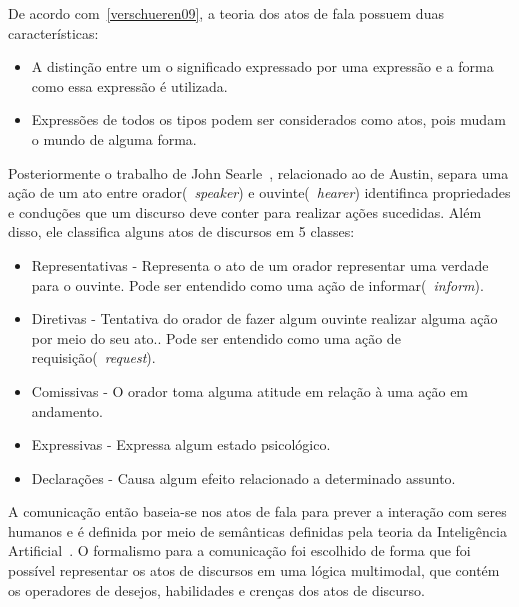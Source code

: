 De acordo com~\ref{verschueren09}, a teoria dos atos de fala possuem duas características:
\begin{itemize}
	\item A distinção entre um o significado expressado por uma expressão e a forma como essa expressão é utilizada.
	\item Expressões de todos os tipos podem ser considerados como atos, pois mudam o mundo de alguma forma.
\end{itemize}

Posteriormente o trabalho de John Searle~\cite{searle69}, relacionado ao de Austin, separa uma ação de um ato entre orador(~\emph{speaker}) e ouvinte(~\emph{hearer}) identifinca propriedades e conduções que um discurso deve conter para realizar ações sucedidas. Além disso, ele classifica alguns atos de discursos em 5 classes:
\begin{itemize}
	\item Representativas - Representa o ato de um orador representar uma verdade para o ouvinte. Pode ser entendido como uma ação de informar(~\emph{inform}).
	\item Diretivas - Tentativa do orador de fazer algum ouvinte realizar alguma ação por meio do seu ato.. Pode ser entendido como uma ação de requisição(~\emph{request}).
	\item Comissivas - O orador toma alguma atitude em relação à uma ação em andamento.
	\item Expressivas - Expressa algum estado psicológico.
	\item Declarações - Causa algum efeito relacionado a determinado assunto.
\end{itemize}

A comunicação então baseia-se nos atos de fala para prever a interação com seres humanos e é definida por meio de semânticas definidas pela teoria da Inteligência Artificial~\cite{wooldridge04}. O formalismo para a comunicação foi escolhido de forma que foi possível representar os atos de discursos em uma lógica multimodal, que contém os operadores de desejos, habilidades e crenças dos atos de discurso.

